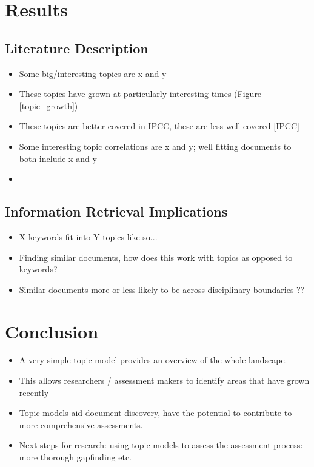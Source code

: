 \documentclass{article}
\begin{document}
\section*{Results}
\subsection*{Literature Description}
\begin{itemize}
	\item Some big/interesting topics are x and y
	\item These topics have grown at particularly interesting times (Figure \ref{topic_growth})
    \item These topics are better covered in IPCC, these are less well covered \ref{IPCC}
    \item Some interesting topic correlations are x and y; well fitting documents to both include x and y
    \item
\end{itemize}

\subsection*{Information Retrieval Implications}
\begin{itemize}
    \item X keywords fit into Y topics like so...
    \item Finding similar documents, how does this work with topics as opposed to keywords?
    \item Similar documents more or less likely to be across disciplinary boundaries ??
\end{itemize}

\section*{Conclusion}
\begin{itemize}
	\item A very simple topic model provides an overview of the whole landscape.
    \item This allows researchers / assessment makers to identify areas that have grown recently
    \item Topic models aid document discovery, have the potential to contribute to more comprehensive assessments.
    \item Next steps for research: using topic models to assess the assessment process: more thorough gapfinding etc.
\end{itemize}
\end{document}
